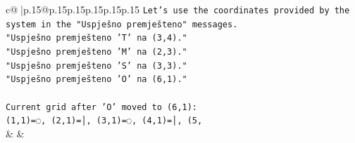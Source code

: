 \documentclass{article}
\begin{document}
{\begin{supertabular}{c@{$\;$}|p{.15\linewidth}@{}p{.15\linewidth}p{.15\linewidth}p{.15\linewidth}p{.15\linewidth}p{.15\linewidth}}
{{{\texttt{Let's use the coordinates provided by the system in the "Uspješno premješteno" messages.} \\
\texttt{"Uspješno premješteno 'T' na (3,4)."} \\
\texttt{"Uspješno premješteno 'M' na (2,3)."} \\
\texttt{"Uspješno premješteno 'S' na (3,3)."} \\
\texttt{"Uspješno premješteno 'O' na (6,1)."} \\
\\ 
\texttt{Current grid after 'O' moved to (6,1):} \\
\texttt{(1,1)=◌, (2,1)=│, (3,1)=◌, (4,1)=│, (5,} \\
            }
        }
    }
    & & \\ \\


\end{supertabular}}
\end{document}

